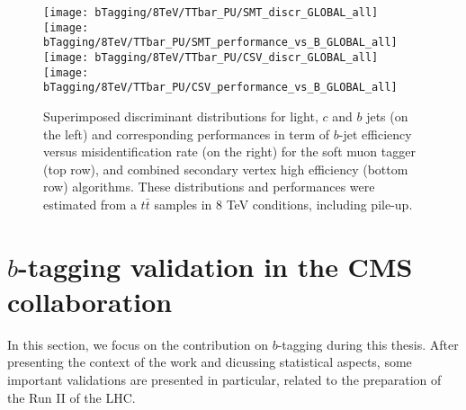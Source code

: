     \begin{figure}[th!]
        \centering
        \begin{minipage}{\textwidth}
        \texttt{[image: bTagging/8TeV/TTbar\_PU/SMT\_discr\_GLOBAL\_all]}
        \texttt{[image: bTagging/8TeV/TTbar\_PU/SMT\_performance\_vs\_B\_GLOBAL\_all]}\\
        \texttt{[image: bTagging/8TeV/TTbar\_PU/CSV\_discr\_GLOBAL\_all]}
        \texttt{[image: bTagging/8TeV/TTbar\_PU/CSV\_performance\_vs\_B\_GLOBAL\_all]}\\
        \end{minipage}
        \caption{Superimposed discriminant distributions for light, $c$ and $b$ jets (on
        the left) and corresponding performances in term of $b$-jet efficiency versus
        misidentification rate (on the right) for the soft muon tagger (top row), and
        combined secondary vertex high efficiency (bottom row) algorithms. These
        distributions and performances were estimated from a $t\bar{t}$ samples in 8 TeV
        conditions, including pile-up.}
        \label{fig:bTagging/perfSMTandCSV}
    \end{figure}


    \section{$b$-tagging validation in the CMS collaboration \label{sec:bTagValidation}}

    In this section, we focus on the contribution on $b$-tagging during this thesis.
    After presenting the context of the work and dicussing statistical aspects, some
    important validations are presented in particular, related to the preparation of the
    Run II of the LHC.

